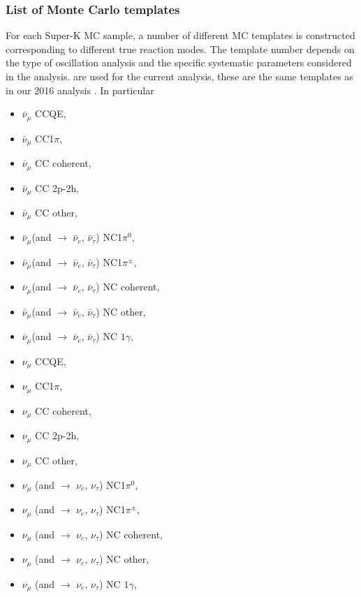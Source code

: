 \subsubsection {List of Monte Carlo templates}
\label{app:details:mc_templates:template_list}

For each Super-K MC sample, a number of different MC templates is constructed corresponding to different true reaction modes. The template number depends on the type of oscillation analysis and the specific systematic parameters considered in the analysis. \NMCTemplate{} are used for the current analysis, these are the same templates as in our 2016 analysis \cite{OurRun17cCC1piJointAnalysis3Flavour}. In particular

\begin{itemize}

\item  $\bar{\nu}_{\mu}$ CCQE,
\item  $\bar{\nu}_{\mu}$ CC1$\pi$,
\item  $\bar{\nu}_{\mu}$ CC coherent,
\item  $\bar{\nu}_{\mu}$ CC 2p-2h,
\item  $\bar{\nu}_{\mu}$ CC other,

\item  $\bar{\nu}_{\mu}$(and $\rightarrow$ $\bar{\nu}_{e}$, $\bar{\nu}_{\tau}$) NC1$\pi^{0}$,
\item  $\bar{\nu}_{\mu}$(and $\rightarrow$ $\bar{\nu}_{e}$, $\bar{\nu}_{\tau}$) NC1$\pi^{\pm}$,
\item  $\bar{\nu}_{\mu}$(and $\rightarrow$ $\bar{\nu}_{e}$, $\bar{\nu}_{\tau}$) NC coherent,
\item  $\bar{\nu}_{\mu}$(and $\rightarrow$ $\bar{\nu}_{e}$, $\bar{\nu}_{\tau}$) NC other,
\item  $\bar{\nu}_{\mu}$(and $\rightarrow$ $\bar{\nu}_{e}$, $\bar{\nu}_{\tau}$) NC $1\gamma$,

\item  $\nu_{\mu}$ CCQE,
\item  $\nu_{\mu}$ CC1$\pi$, 
\item  $\nu_{\mu}$ CC coherent, 
\item  $\nu_{\mu}$ CC 2p-2h,
\item  $\nu_{\mu}$ CC other, 
\item  $\nu_{\mu}$ (and $\rightarrow$ $\nu_{e}$, $\nu_{\tau}$) NC1$\pi^{0}$,
\item  $\nu_{\mu}$ (and $\rightarrow$ $\nu_{e}$, $\nu_{\tau}$) NC1$\pi^{\pm}$, 
\item  $\nu_{\mu}$ (and $\rightarrow$ $\nu_{e}$, $\nu_{\tau}$) NC coherent,
\item  $\nu_{\mu}$ (and $\rightarrow$ $\nu_{e}$, $\nu_{\tau}$) NC other, 
\item  $\nu_{\mu}$ (and $\rightarrow$ $\nu_{e}$, $\nu_{\tau}$) NC $1\gamma$, 


\end{itemize}
